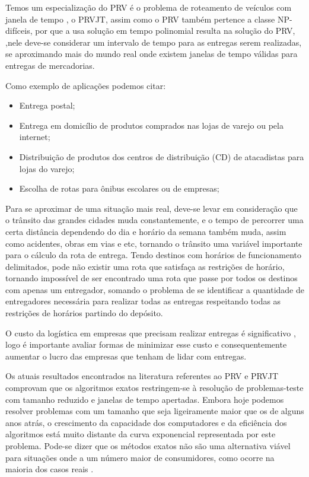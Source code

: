 Temos um especialização do PRV é o problema de roteamento de veículos com
janela de tempo , o PRVJT, assim como o PRV também pertence a classe NP-difíceis, por que a usa solução em tempo polinomial resulta na solução do PRV, ,nele deve-se considerar um intervalo de tempo para as entregas serem realizadas, se aproximando mais do mundo real onde existem janelas de tempo válidas para entregas de mercadorias. 


Como exemplo de aplicações podemos citar:
\begin{itemize}
	\item Entrega postal;
	\item Entrega em domicílio de produtos comprados nas lojas de varejo ou pela internet;
	\item Distribuição de produtos dos centros de distribuição (CD) de atacadistas para lojas do varejo;
	\item Escolha de rotas para ônibus escolares ou de empresas;
\end{itemize}

Para se aproximar de uma situação mais real, deve-se levar em consideração que o trânsito das grandes cidades muda constantemente, e o tempo de percorrer uma certa distância dependendo do dia e horário da semana também muda, assim como acidentes, obras em vias e etc, tornando o trânsito uma variável importante para o cálculo da rota de entrega. Tendo destinos com horários de funcionamento delimitados, pode não existir uma rota que satisfaça as restrições de horário, tornando impossível de ser encontrado uma rota que passe por todos os destinos com apenas um entregador, somando o problema de se identificar a quantidade de entregadores necessária para realizar todas as entregas respeitando todas as restrições de horários partindo do depósito. 

O custo da logística em empresas que precisam realizar entregas é significativo \cite{RODRIGUES}, logo é importante avaliar formas de minimizar esse custo e consequentemente aumentar o lucro das empresas que tenham de lidar com entregas.

Os atuais resultados encontrados na literatura referentes ao PRV e PRVJT comprovam que os algoritmos exatos restringem-se à resolução de problemas-teste com tamanho reduzido e janelas de tempo apertadas. Embora hoje podemos resolver problemas com um tamanho que seja ligeiramente maior que os de alguns anos atrás, o crescimento da capacidade dos computadores e da eficiência dos algoritmos está muito distante da curva exponencial representada por este problema. Pode-se dizer que os métodos exatos não são uma alternativa viável para situações onde a um número maior de consumidores, como ocorre na maioria dos casos reais \cite{Chabrier}.

